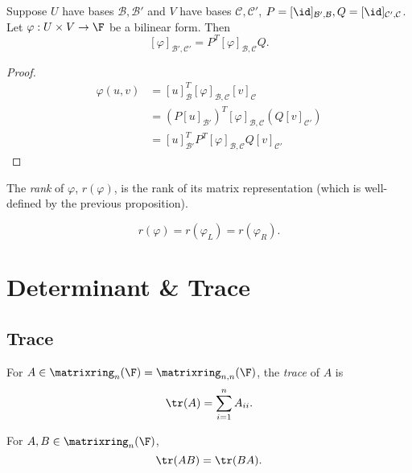 \documentclass[a4paper]{article}
\newcommand*{\M}{\matrixring}
\newcommand*{\basis}{\mathcal}
\theoremstyle{definition}
\begin{document}
\begin{proposition}
  \label{prop:change of basis of bilinear form}
  Suppose \(U\) have bases \(\basis B, \basis B'\) and \(V \) have bases \(\basis C, \basis C'\), \(P = [\id]_{\basis B', \basis B}, Q = [\id]_{\basis C',\basis C}\). Let \(\varphi: U \times V \to \F\) be a bilinear form. Then
  \[
    [\varphi]_{\basis B',\basis C'} = P^T[\varphi]_{\basis B,\basis C}Q.
  \]
\end{proposition}

\begin{proof}
  \begin{align*}
    \varphi(u, v) &= [u]_{\basis B}^T [\varphi]_{\basis B, \basis C} [v]_{\basis C} \\
                  &= (P[u]_{\basis B'})^T [\varphi]_{\basis B, \basis C} (Q[v]_{\basis C'}) \\
                  &= [u]_{\basis B'}^T P^T[\varphi]_{\basis B, \basis C}Q[v]_{\basis C'} 
  \end{align*}
\end{proof}

\begin{definition}
  The \emph{rank} of \(\varphi\), \(r(\varphi)\), is the rank of its matrix representation (which is well-defined by the previous proposition).
\end{definition}

\begin{note}
  \[
    r(\varphi) = r(\varphi_L) = r(\varphi_R).
  \]
\end{note}

\section{Determinant \& Trace}


\subsection{Trace}

\begin{definition}[Trace]
  For \(A \in \M_n(\F) = \M_{n,n}(\F)\), the \emph{trace} of \(A\) is
  \[
    \tr(A) = \sum_{i=1}^{n}A_{ii}.
  \]
\end{definition}

\begin{lemma}
  For \(A, B\in \M_n(\F)\),
  \[
    \tr(AB) = \tr(BA).
  \]
\end{lemma}
\end{document}
